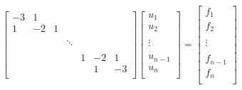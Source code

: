 \[\label{sys:1}
\begin{bmatrix}
    -3		& 	1 		& 	 		&			&			&			&			\\
    1		&	-2 		&	1 		&			& 			&			&			\\
    			&		 	&  			&			& 			&			&			\\
    			&		 	&	 		&  \ddots	&   			&			&			\\
    			&		 	&  			&			& 			&			&			\\
    			&			&	 		&			& 	1		&  	-2		&	1		\\
    			&		 	&	 		&			& 			&	1		&	-3		\\
\end{bmatrix}
\begin{bmatrix}
    u_1		\\
    u_2		\\
    			\\
    \vdots 	\\
    			\\
    u_{n-1}	\\
    u_n		\\
\end{bmatrix}
=
\begin{bmatrix}
    f_1		\\
    f_2		\\
    			\\
    \vdots 	\\
    			\\
    f_{n	-1}	\\
    f_n		\\
\end{bmatrix}
\]